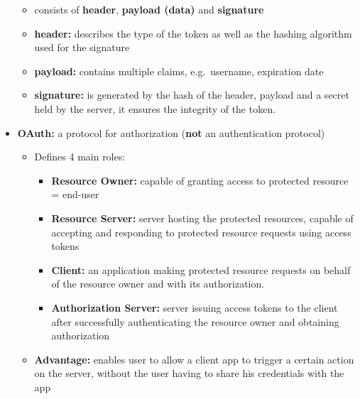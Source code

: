 \documentclass[ieeetran]{article}
\begin{document}
\begin{itemize}
	\begin{itemize}
	  \item consists of \textbf{header}, \textbf{payload (data)} and \textbf{signature}
	\item \textbf{header:} describes the type of the token as well as the hashing algorithm used for the signature
	\item \textbf{payload:} contains multiple claims, e.g.\ username, expiration date
\item \textbf{signature:} is generated by the hash of the header, payload and a secret held by the server, it ensures the integrity of the token.
	\end{itemize}

\item \textbf{OAuth:} a protocol for authorization (\textbf{not} an authentication protocol) 
	\begin{itemize}
		\item Defines 4 main roles:

\begin{itemize}
	  \item \textbf{Resource Owner:} capable of granting access to protected resource = end-user
	\item \textbf{Resource Server:} server hosting the protected resources, capable of accepting and responding to protected resource requests using access tokens
\item \textbf{Client:} an application making protected resource requests on behalf of the resource owner and with its authorization.
\item \textbf{Authorization Server:} server issuing access tokens to the client after successfully authenticating the resource owner and obtaining authorization
	\end{itemize}

	\item \textbf{Advantage:} enables user to allow a client app to trigger a certain action on the server, without the user having to share his credentials with the app
	\end{itemize}
	

\end{itemize}
\end{document}
